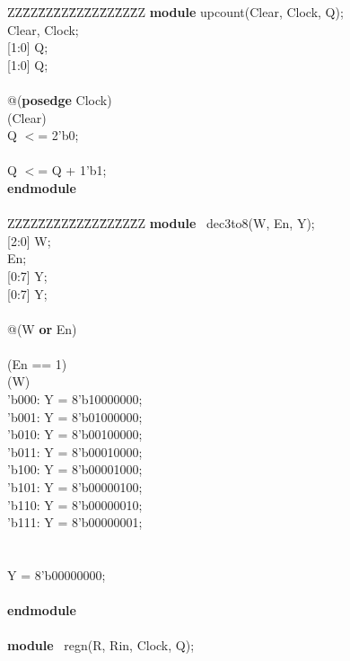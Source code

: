 \documentclass[epsfig,10pt,fullpage]{article}
\begin{document}
\begin{center}
\begin{minipage}[t]{12.5 cm}
\begin{tabbing}
ZZ\=ZZ\=ZZ\=ZZ\=ZZ\=ZZ\=ZZ\=ZZ\=ZZ\kill
{\bf module} upcount(Clear, Clock, Q);\\
 Clear, Clock;\\
 [1:0] Q;\\
 [1:0] Q;\\
~\\
 @({\bf posedge} Clock)\\
\> (Clear)\\
\>\>\>Q $<$= 2'b0;\\
\> \\
\>\>\>Q $<$= Q + 1'b1;\\
{\bf endmodule}\\
~\\
ZZ\=ZZ\=ZZ\=ZZ\=ZZ\=ZZ\=ZZ\=ZZ\=ZZ\kill
{\bf module} ~dec3to8(W, En, Y);\\
 [2:0] W;\\
 En;\\
 [0:7] Y;\\
 [0:7] Y;\\
~\\	
 @(W {\bf or} En)\\
\\
\> (En == 1)\\
\>\> (W)\\
\>\>\>'b000: Y = 8'b10000000;\\
\>\>\>'b001: Y = 8'b01000000;\\
\>\>\>'b010: Y = 8'b00100000;\\
\>\>\>'b011: Y = 8'b00010000;\\
\>\>\>'b100: Y = 8'b00001000;\\
\>\>\>'b101: Y = 8'b00000100;\\
\>\>\>'b110: Y = 8'b00000010;\\
\>\>\>'b111: Y = 8'b00000001;\\
\>\>\\
\> \\
\>\>\>Y = 8'b00000000;\\
\\
{\bf endmodule}\\
~\\
{\bf module} ~regn(R, Rin, Clock, Q);\\

\end{tabbing}
\end{minipage}
\end{center}
\end{document}
